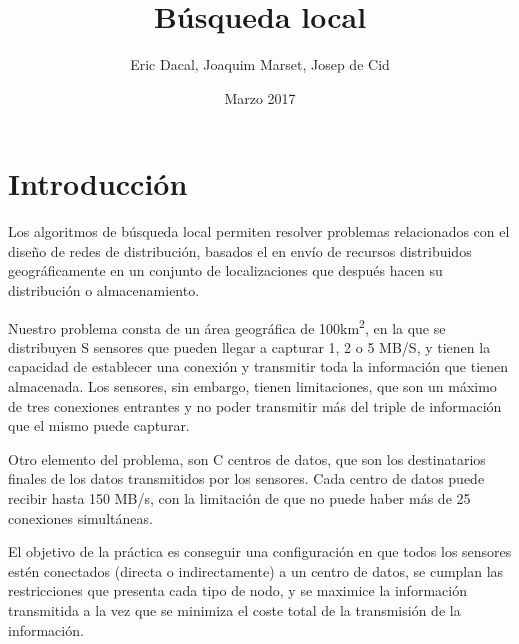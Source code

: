 \documentclass{article}
\title{\LARGE Búsqueda local}
\author{\large Eric Dacal, Joaquim Marset, Josep de Cid}
\date{Marzo 2017}
\begin{document}
\maketitle

\section{Introducción}

Los algoritmos de búsqueda local permiten resolver problemas relacionados con el diseño de redes de distribución, basados el en envío de recursos distribuidos geográficamente en un conjunto de localizaciones que después hacen su distribución o almacenamiento.

Nuestro problema consta de un área geográfica de 100km\textsuperscript{2}, en la que se distribuyen S sensores que pueden llegar a capturar 1, 2 o 5 MB/S, y tienen la capacidad de establecer una conexión y transmitir toda la información que tienen almacenada. Los sensores, sin embargo, tienen limitaciones, que son un máximo de tres conexiones entrantes y no poder transmitir más del triple de información que el mismo puede capturar.\par
Otro elemento del problema, son C centros de datos, que son los destinatarios finales de los datos transmitidos por los sensores. Cada centro de datos puede recibir hasta 150 MB/s, con la limitación de que no puede haber más de 25 conexiones simultáneas.\newline

El objetivo de la práctica es conseguir una configuración en que todos los sensores estén conectados (directa o indirectamente) a un centro de datos, se cumplan las restricciones que presenta cada tipo de nodo, y se maximice la información transmitida a la vez que se minimiza el coste total de la transmisión de la información.
\end{document}
